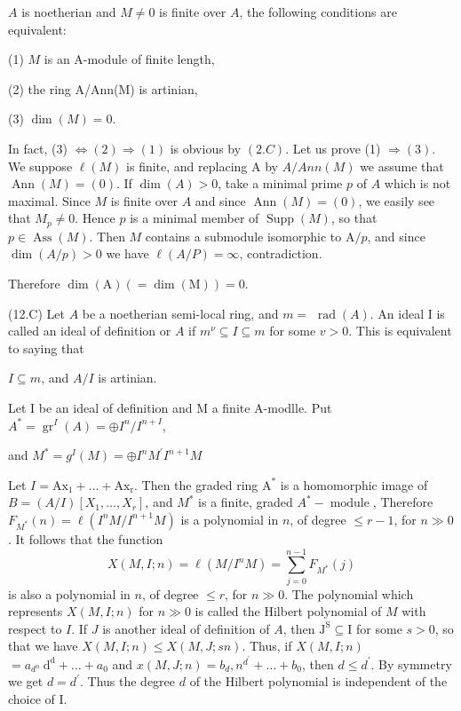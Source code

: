 $A$ is noetherian and $M \neq 0$ is finite over $A$, the following conditions are equivalent:

(1) $M$ is an A-module of finite length,

(2) the ring A/Ann(M) is artinian,

(3) $\operatorname{dim}(M)=0$.

In fact, (3) $\Leftrightarrow(2) \Rightarrow(1)$ is obvious by $(2 . C)$. Let us prove (1) $\Rightarrow(3)$. We suppose $\ell(M)$ is finite, and replacing A by $A / A n n(M)$ we assume that $\operatorname{Ann}(M)=(0)$. If $\operatorname{dim}(A)>0$, take a minimal prime $p$ of $A$ which is not maximal. Since $M$ is finite over $A$ and since $\operatorname{Ann}(M)=(0)$, we easily see that $M_{p} \neq 0$. Hence $p$ is a minimal member of $\operatorname{Supp}(M)$, so that $p \in \operatorname{Ass}(M)$. Then $M$ contains a submodule isomorphic to $\mathrm{A} / p$, and since $\operatorname{dim}(A / p)>0$ we have $\ell(A / P)=\infty$, contradiction.

Therefore $\operatorname{dim}(\mathrm{A})(=\operatorname{dim}(\mathrm{M}))=0$.

(12.C) Let $A$ be a noetherian semi-local ring, and $m=$ $\operatorname{rad}(A)$. An ideal I is called an ideal of definition or $A$ if $m^{\nu} \subseteq I \subseteq m$ for some $v>0$. This is equivalent to saying that

$I \subseteq m$, and $A / I$ is artinian.

Let I be an ideal of definition and M a finite A-modlle. Put $A^{*}=\operatorname{gr}^{I}(A)=\oplus I^{n} / I^{n+I}$,

and $M^{*}=g^{I}(M)=\oplus I^{n} M^{\prime} I^{n+1} M$

Let $I=\mathrm{Ax}_{1}+\ldots+\mathrm{Ax}_{\mathrm{r}}$. Then the graded ring $\mathrm{A}^{*}$ is a homomorphic image of $B=(A / I)\left[X_{1}, \ldots, X_{r}\right]$, and $M^{*}$ is a finite, graded $A^{*}-\operatorname{module}$, Therefore $F_{M^{*}}(n)=\ell\left(I^{n} M / I^{n+1} M\right)$ is a polynomial in $n$, of degree $\leqslant r-1$, for $n \gg 0$. It follows that the function
$$
X(M, I ; n)=\ell\left(M / I^{n} M\right)=\sum_{j=0}^{n-1} F_{M^{*}}(j)
$$
is also a polynomial in $n$, of degree $\leqslant r$, for $n \gg 0$. The polynomial which represents $X(M, I ; n)$ for $n \gg 0$ is called the Hilbert polynomial of $M$ with respect to $I$. If $J$ is another ideal of definition of $A$, then $\mathrm{J}^{\mathrm{S}} \subseteq \mathrm{I}$ for some $s>0$, so that we have $X(M, I ; n) \leqslant X(M, J ; s n)$. Thus, if $X(M, I ; n)$ $=a_{d^{n}} \mathrm{~d}^{\mathrm{d}}+\ldots+a_{0}$ and $x(M, J ; n)=b_{d}, n^{d^{\prime}}+\ldots+b_{0}$, then $d \leqslant d^{\prime}$. By symmetry we get $d=d^{\prime}$. Thus the degree $d$ of the Hilbert polynomial is independent of the choice of I.

